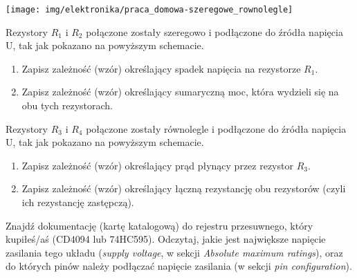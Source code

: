 \documentclass{pdfBooklets}
\begin{document}
\vspace{13pt}
\begin{center}\texttt{[image: img/elektronika/praca\_domowa-szeregowe\_rownolegle]}\end{center}
\vspace{-7pt}

\begin{Zadanie}{}{}
  Rezystory $R_1$ i $R_2$ połączone zostały szeregowo i podłączone do źródła napięcia U, tak jak pokazano na powyższym schemacie.
  \begin{enumerate}[label=\alph*)]
    \item Zapisz zależność (wzór) określający spadek napięcia na rezystorze $R_1$.
    \item Zapisz zależność (wzór) określający sumaryczną moc, która wydzieli się na obu tych rezystorach.
  \end{enumerate}
\end{Zadanie}

\begin{Zadanie}{}{}
  Rezystory $R_3$ i $R_4$ połączone zostały równolegle i podłączone do źródła napięcia U, tak jak pokazano na powyższym schemacie.
  \begin{enumerate}[label=\alph*)]
    \item Zapisz zależność (wzór) określający prąd płynący przez rezystor $R_3$.
    \item Zapisz zależność (wzór) określający łączną rezystancję obu rezystorów (czyli ich rezystancję zastępczą).
  \end{enumerate}
\end{Zadanie}

\begin{Zadanie}{}{}
  Znajdź dokumentację (kartę katalogową) do rejestru przesuwnego, który kupiłeś/aś (CD4094 lub 74HC595).
  Odczytaj, jakie jest największe napięcie zasilania tego układu (\textit{supply voltage}, w sekcji
  \textit{Absolute maximum ratings}), oraz do których pinów należy podłączać napięcie zasilania (w sekcji \textit{pin configuration}).
\end{Zadanie}


\end{document}
